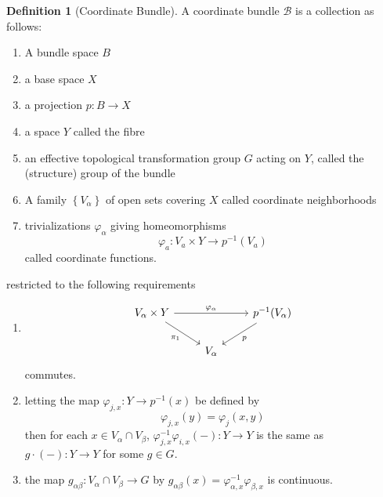 \documentclass[reqno]{amsart}
\theoremstyle{definition}
\newtheorem{definition}[theorem]{Definition}
\theoremstyle{remark}
\begin{document}
\begin{definition}[Coordinate Bundle]
    A coordinate bundle
    $\mathcal{B}$ is a collection as follows:
    \begin{enumerate}
        \item A bundle space $B$ 
        \item a base space $X$ 
        \item a projection $p \colon B \to X$ 
        \item a space $Y $ called the fibre
        \item an effective topological transformation group
            $G$ acting on $Y$, called the
            (structure) group of the bundle
        \item A family $\left\{ V_\alpha \right\} $ of open
            sets covering $X$ called coordinate neighborhoods
        \item trivializations $\varphi_\alpha$ 
            giving homeomorphisms
            \[
            \varphi_a \colon V_a \times Y \to p^{-1}(V_a)
            \] 
            called coordinate functions.
    \end{enumerate}
    restricted to the following requirements
    \begin{enumerate}
        \item 
        \begin{equation*}
        \begin{tikzcd}
            V_{\alpha} \times Y \ar[rr, "\varphi_{\alpha}"]
            \ar[dr, "\pi_1"']
            && p^{-1}(V_{\alpha})
            \ar[dl, "p"] \\
                                        & V_{\alpha}&
        \end{tikzcd}
        \end{equation*}
        commutes.
    \item letting the map
        $\varphi_{j,x} \colon Y \to p^{-1}(x)$ be defined
        by
        \[
        \varphi_{j,x}(y) = \varphi_j (x,y)
        \] 
        then for each $x \in V_{\alpha} \cap V_{\beta}$,
        $\varphi_{j,x}^{-1}\varphi_{i,x} (-) \colon
        Y \to Y $ is the same as
        $g \cdot (-) \colon Y \to Y$ for some
        $g \in G$.
    \item the map $g_{\alpha \beta} \colon V_\alpha
        \cap V_\beta \to G$ by
        $g_{\alpha \beta}(x) = 
        \varphi_{\alpha,x}^{-1} \varphi_{\beta,x}$ is continuous.
    \end{enumerate}
\end{definition}
\end{document}
